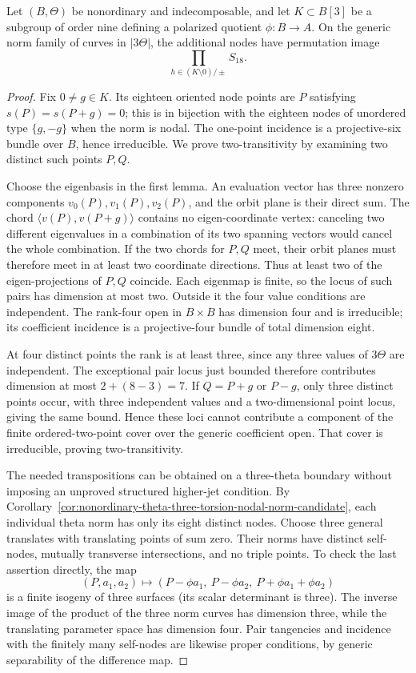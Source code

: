 \begin{proposition}
\label{prop:nonordinary-three-torsion-node-product-candidate}
Let $(B,\Theta)$ be nonordinary and indecomposable, and let
$K\subset B[3]$ be a subgroup of order nine defining a polarized
quotient $\phi:B\to A$. On the generic norm family of curves in
$|3\Theta|$, the additional nodes have permutation image
\[
                      \prod_{h\in(K\setminus0)/\pm} S_{18}.
\]
\end{proposition}
\begin{proof}
Fix $0\ne g\in K$. Its eighteen oriented node points are
$P$ satisfying $s(P)=s(P+g)=0$; this is in bijection with the
eighteen nodes of unordered type $\{g,-g\}$ when the norm is
nodal. The one-point incidence is a projective-six bundle over
$B$, hence irreducible. We prove two-transitivity by examining
two distinct such points $P,Q$.

Choose the eigenbasis in the first lemma. An evaluation vector
has three nonzero components $v_0(P),v_1(P),v_2(P)$, and the
orbit plane is their direct sum. The chord
$\langle v(P),v(P+g)\rangle$ contains no eigen-coordinate vertex:
canceling two different eigenvalues in a combination of its
two spanning vectors would cancel the whole combination.
If the two chords for $P,Q$ meet, their orbit planes must
therefore meet in at least two coordinate directions. Thus at
least two of the eigen-projections of $P,Q$ coincide. Each
eigenmap is finite, so the locus of such pairs has dimension
at most two. Outside it the four value conditions are
independent. The rank-four open in $B\times B$ has dimension
four and is irreducible; its coefficient incidence is a
projective-four bundle of total dimension eight.

At four distinct points the rank is at least three, since any
three values of $3\Theta$ are independent. The exceptional
pair locus just bounded therefore contributes dimension at
most $2+(8-3)=7$. If $Q=P+g$ or $P-g$, only three distinct
points occur, with three independent values and a two-dimensional
point locus, giving the same bound. Hence these loci cannot
contribute a component of the finite \etale ordered-two-point
cover over the generic coefficient open. That cover is
irreducible, proving two-transitivity.

The needed transpositions can be obtained on a three-theta
boundary without imposing an unproved structured higher-jet
condition. By
Corollary~\ref{cor:nonordinary-theta-three-torsion-nodal-norm-candidate},
each individual theta norm has only its eight distinct nodes.
Choose three general translates with translating points of sum
zero. Their norms have distinct self-nodes, mutually transverse
intersections, and no triple points. To check the last assertion
directly, the map
\[
 (P,a_1,a_2)\longmapsto(P-\phi a_1,\ P-\phi a_2,\ P+\phi a_1+\phi a_2)
\]
is a finite \etale isogeny of three surfaces (its scalar
determinant is three). The inverse image of the product of
the three norm curves has dimension three, while the translating
parameter space has dimension four. Pair tangencies and incidence
with the finitely many self-nodes are likewise proper conditions,
by generic separability of the difference map.


\end{proof}
